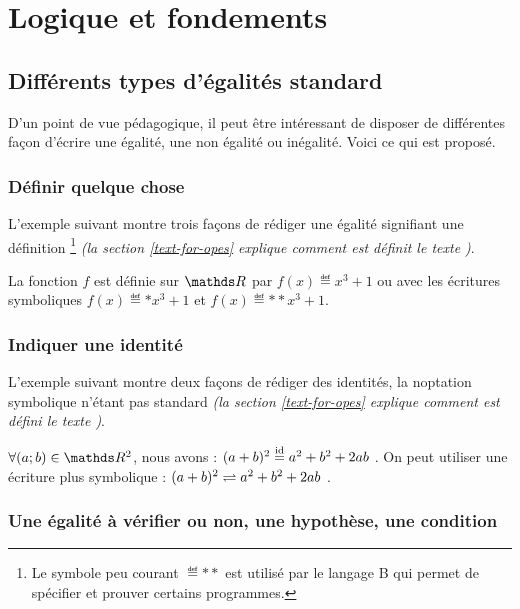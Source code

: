 \documentclass[12pt,a4paper]{article}
\theoremstyle{definition}
\begin{document}
\section{Logique et fondements}

    \subsection{Différents types d'égalités \og standard \fg}
    
D'un point de vue pédagogique, il peut être intéressant de disposer de différentes façon d'écrire une égalité, une non égalité ou inégalité. Voici ce qui est proposé.

        \subsubsection{Définir quelque chose}

L'exemple suivant montre trois façons de rédiger une égalité signifiant une définition
\footnote{
	Le symbole peu courant $\eqdef**$ est utilisé par le langage B qui permet de spécifier et prouver certains programmes.
}
\emph{(la section \ref{text-for-opes} explique comment est définit le texte \emph{\og \textopdef \fg})}.

\begin{tcblisting}{}
La fonction $f$ est définie sur $\RR$ par $f(x) \eqdef x^3 + 1$ ou avec les écritures 
symboliques $f(x) \eqdef* x^3 + 1$ et $f(x) \eqdef** x^3 + 1$.
\end{tcblisting}


        \subsubsection{Indiquer une identité}

L'exemple suivant montre deux façons de rédiger des identités, la noptation symbolique n'étant pas standard \emph{(la section \ref{text-for-opes} explique comment est défini le texte \emph{\og \textopid \fg})}.

\begin{tcblisting}{}
$\forall (a ; b) \in \RR^2$, nous avons : $(a + b)^2 \eqid a^2 + b^2 + 2 a b$ .
On peut utiliser une écriture plus symbolique : $(a + b)^2 \eqid* a^2 + b^2 + 2 a b$ .
\end{tcblisting}


        \subsubsection{Une égalité à vérifier ou non, une hypothèse, une condition}
\end{document}
